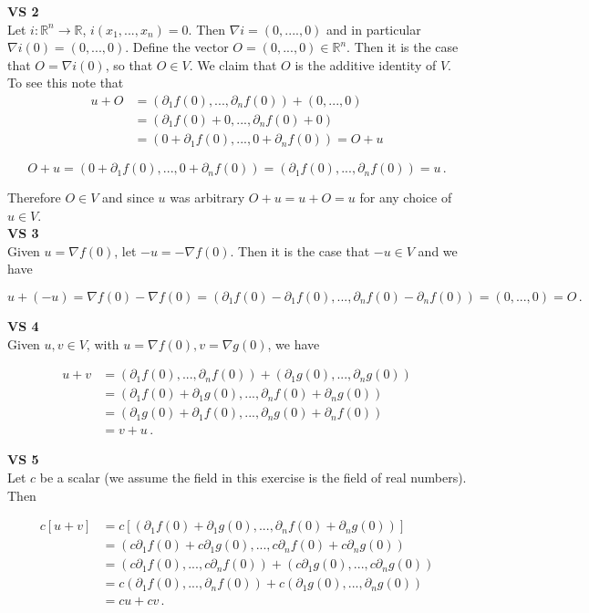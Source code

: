 \documentclass[11pt]{article}
\begin{document}
\textbf{VS 2}\\

Let $i : \mathbb{R}^n \rightarrow \mathbb{R}$, $i(x_1,...,x_n) = 0$. Then $\nabla i = (0,....,0)$ and in particular $\nabla i(0) = (0,...,0)$. Define the vector $O = (0,...,0) \in \mathbb{R}^n$. Then it is the case that $O = \nabla i(0)$, so that $O \in V$. We claim that $O$ is the additive identity of $V$. To see this note that
\begin{align*}
u + O &= (\partial_1 f(0),...,\partial_n f(0)) + (0,...,0)\\ &= (\partial_1 f(0) + 0,..., \partial_n f(0) +0)\\ &=  (0+\partial_1 f(0),...,0 +\partial_n f(0)) = O + u
\end{align*}

$$
O+u = (0+\partial_1 f(0),...,0 +\partial_n f(0)) = (\partial_1 f(0),...,\partial_n f(0)) = u\,.
$$

Therefore $O \in V$ and since $u$ was arbitrary $O+u = u+O = u$ for any choice of $u \in V$.\\

\textbf{VS 3}\\

Given $u = \nabla f(0)$, let $-u = -\nabla f(0)$. Then it is the case that $-u \in V$ and we have

$$ u + (-u) = \nabla f(0) - \nabla f(0) = (\partial_1 f(0) - \partial_1 f(0),..., \partial_n f(0) - \partial_n f(0)) = (0,...,0) = O\,.$$

\textbf{VS 4}\\

Given $u,v \in V$, with $u = \nabla f(0), v = \nabla g(0)$, we have

\begin{align*}
u+v &= (\partial_1 f(0),...,\partial_n f(0)) + (\partial_1 g(0),...,\partial_n g(0))\\ &= (\partial_1 f(0) + \partial_1 g(0),..., \partial_n f(0) + \partial_n g(0))\\
&= (\partial_1 g(0) + \partial_1 f(0),..., \partial_n g(0) + \partial_n f(0))\\
&= v+u\,.
\end{align*}

\textbf{VS 5}\\

Let $c$ be a scalar (we assume the field in this exercise is the field of real numbers). Then

\begin{align*}c[u+v] &= c[(\partial_1 f(0) + \partial_1 g(0),..., \partial_n f(0) + \partial_n g(0))]\\
&= (c\partial_1 f(0) + c\partial_1 g(0),..., c\partial_n f(0) + c\partial_n g(0))\\
&= (c\partial_1 f(0),..., c\partial_n f(0)) + (c\partial_1 g(0),..., c\partial_n g(0))\\
&= c(\partial_1 f(0),..., \partial_n f(0)) + c(\partial_1 g(0),..., \partial_n g(0)) \\
&= cu+cv\,.
\end{align*}
\end{document}
